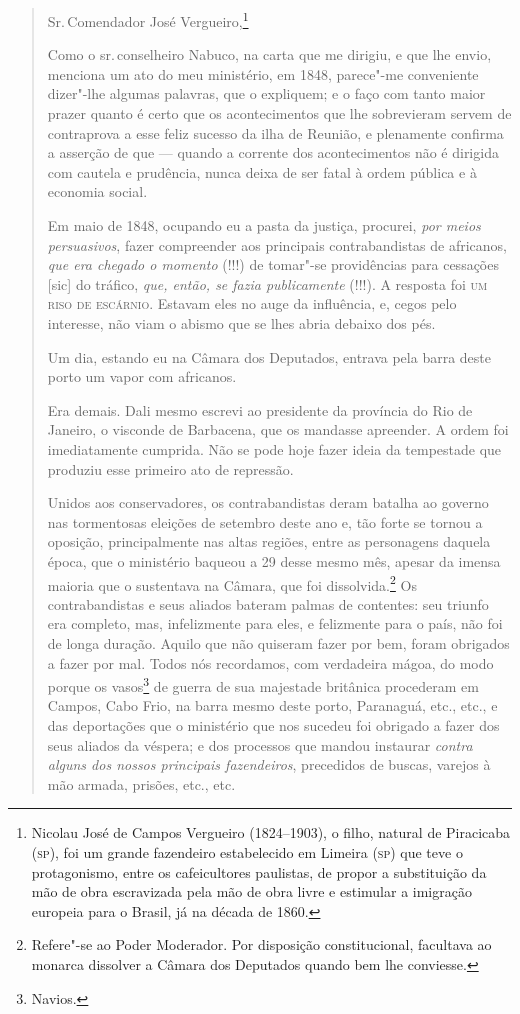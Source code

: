 \begin{quote}
\noindent{}Sr.\,Comendador José Vergueiro,\footnote{Nicolau José de Campos
  Vergueiro (1824--1903), o filho, natural de Piracicaba (\textsc{sp}), foi um
  grande fazendeiro estabelecido em Limeira (\textsc{sp}) que teve o
  protagonismo, entre os cafeicultores paulistas, de propor a
  substituição da mão de obra escravizada pela mão de obra livre e
  estimular a imigração europeia para o Brasil, já na década de 1860.}\smallskip

Como o sr.\,conselheiro Nabuco, na carta que me dirigiu, e que lhe envio,
menciona um ato do meu ministério, em 1848, parece"-me conveniente
dizer"-lhe algumas palavras, que o expliquem; e o faço com tanto maior
prazer quanto é certo que os acontecimentos que lhe sobrevieram servem
de contraprova a esse feliz sucesso da ilha de Reunião, e plenamente
confirma a asserção de que --- quando a corrente dos acontecimentos não
é dirigida com cautela e prudência, nunca deixa de ser fatal à ordem
pública e à economia social.

Em maio de 1848, ocupando eu a pasta da justiça, procurei, \emph{por
meios persuasivos}, fazer compreender aos principais contrabandistas de
africanos, \emph{que era chegado o momento} (!!!) de tomar"-se
providências para cessações {[}sic{]} do tráfico, \emph{que, então, se
fazia publicamente} (!!!). A resposta foi \textsc{um riso de escárnio}. Estavam
eles no auge da influência, e, cegos pelo interesse, não viam o abismo
que se lhes abria debaixo dos pés.

Um dia, estando eu na Câmara dos Deputados, entrava pela barra deste
porto um vapor com africanos.

Era demais. Dali mesmo escrevi ao presidente da província do Rio de
Janeiro, o visconde de Barbacena, que os mandasse apreender. A ordem foi
imediatamente cumprida. Não se pode hoje fazer ideia da tempestade que
produziu esse primeiro ato de repressão.

Unidos aos conservadores, os contrabandistas deram batalha ao governo
nas tormentosas eleições de setembro deste ano e, tão forte se tornou a
oposição, principalmente nas altas regiões, entre as personagens daquela
época, que o ministério baqueou a 29 desse mesmo mês, apesar da imensa
maioria que o sustentava na Câmara, que foi dissolvida.\footnote{
  Refere"-se ao Poder Moderador. Por disposição constitucional,
  facultava ao monarca dissolver a Câmara dos Deputados quando bem lhe
  conviesse.} Os contrabandistas e seus aliados bateram palmas de
contentes: seu triunfo era completo, mas, infelizmente para eles, e
felizmente para o país, não foi de longa duração. Aquilo que não
quiseram fazer por bem, foram obrigados a fazer por mal. Todos nós
recordamos, com verdadeira mágoa, do modo porque os vasos\footnote{
  Navios.} de guerra de sua majestade britânica procederam em Campos,
Cabo Frio, na barra mesmo deste porto, Paranaguá, etc., etc., e das
deportações que o ministério que nos sucedeu foi obrigado a fazer dos
seus aliados da véspera; e dos processos que mandou instaurar
\emph{contra alguns dos nossos principais fazendeiros}, precedidos de
buscas, varejos à mão armada, prisões, etc., etc.


\end{quote}
